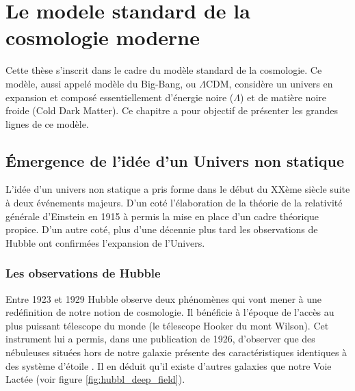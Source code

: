 
\chapter{Le modele standard de la cosmologie moderne}
 \label{ch:introduction_physique}

Cette thèse s'inscrit dans le cadre du modèle standard de la cosmologie.
Ce modèle, aussi appelé modèle du Big-Bang, ou $\Lambda$CDM, considère un univers en expansion et composé essentiellement d'énergie noire ($\Lambda$) et de matière noire froide (Cold Dark Matter). 
Ce chapitre a pour objectif de présenter les grandes lignes de ce modèle.

\section{Émergence de l'idée d'un Univers non statique}



L'idée d'un univers non statique a pris forme dans le début du XXème siècle suite à deux événements majeurs.
D'un coté l'élaboration de la théorie de la relativité générale d'Einstein en 1915 à permis la mise en place d'un cadre théorique propice.
D'un autre coté, plus d'une décennie plus tard les observations de Hubble ont confirmées l'expansion de l'Univers.

\subsection{Les observations de Hubble}

Entre 1923 et 1929 Hubble observe deux phénomènes qui vont mener à une redéfinition de notre notion de cosmologie.
Il bénéficie à l'époque de l'accès au plus puissant télescope du monde (le télescope Hooker du mont Wilson).
Cet instrument lui a permis, dans une publication de 1926, d'observer que des nébuleuses situées hors de notre galaxie présente des caractéristiques identiques à des système d'étoile \citep{1926ApJ....63..236H}.
Il en déduit qu'il existe d'autres galaxies que notre Voie Lactée (voir figure \ref{fig:hubbl_deep_field}).

